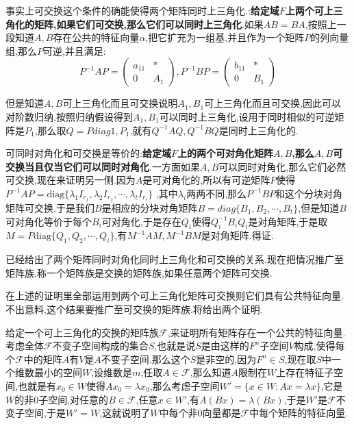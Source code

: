 事实上可交换这个条件的确能使得两个矩阵同时上三角化.:\textbf{给定域$F$上两个可上三角化的矩阵,如果它们可交换,那么它们可以同时上三角化}.如果$AB=BA$,按照上一段知道$A,B$存在公共的特征向量$\alpha$,把它扩充为一组基,并且作为一个矩阵$P$的列向量组,那么$P$可逆,并且满足:
$$P^{-1}AP=\left(\begin{array}{cc}
a_{11}&*\\
0&A_1
\end{array}\right),P^{-1}BP=\left(\begin{array}{cc}
b_{11}&*\\
0&B_1
\end{array}\right)$$

但是知道$A,B$可上三角化而且可交换说明$A_1,B_1$可上三角化而且可交换,因此可以对阶数归纳,按照归纳假设得到$A_1,B_1$可以同时上三角化,设用于同时相似的可逆矩阵是$P_1$,那么取$Q=P diag{1,P_1}$,就有$Q^{-1}AQ,Q^{-1}BQ$是同时上三角化的.

可同时对角化和可交换是等价的:\textbf{给定域$F$上的两个可对角化矩阵$A,B$,那么$A,B$可交换当且仅当它们可以同时对角化}.一方面如果$A,B$可以同时对角化,那么它们必然可交换,现在来证明另一侧.因为$A$是可对角化的,所以有可逆矩阵$P$使得$P^ {-1}AP=\mathrm{diag}\{\lambda_1I_{r_1},\lambda_2I_{r_2},\cdots,\lambda_tI_{r_t}\}$
,其中$\lambda_i$两两不同,那么$P^{-1}BP$和这个分块对角矩阵可交换.于是我们$B$是相应的分块对角矩阵$B=diag\{B_1,B_2,\cdots,B_t\}$,但是知道$B$可对角化等价于每个$B_i$可对角化,于是存在$Q_i$使得$Q_i^{-1}B_iQ_i$是对角矩阵,于是取$M=P\mathrm{diag}\{Q_1,Q_2,\cdots,Q_t\}$,有$M^ {-1}AM,M^{-1}BM$是对角矩阵.得证.

已经给出了两个矩阵同时对角化同时上三角化和可交换的关系.现在把情况推广至矩阵族.称一个矩阵族是交换的矩阵族,如果任意两个矩阵可交换.

在上述的证明里全部运用到两个可上三角化矩阵可交换则它们具有公共特征向量.不出意料,这个结果要推广至可交换的矩阵族.将给出两个证明.

给定一个可上三角化的交换的矩阵族$\mathscr{F}$,来证明所有矩阵存在一个公共的特征向量.考虑全体$\mathscr{F}$不变子空间构成的集合$S$,也就是说$S$是由这样的$F^n$子空间$V$构成,使得每个$\mathscr{F}$中的矩阵$A$有$V$是$A$不变子空间.那么这个$S$是非空的,因为$F^n\in S$,现在取$S$中一个维数最小的空间$W$,设维数是$m$,任取$A\in\mathscr{F}$,那么知道$A$限制在$W$上存在特征子空间,也就是有$x_0\in W$使得$Ax_0=\lambda x_0$,那么考虑子空间$W'=\{x\in W:Ax=\lambda x\}$,它是$W$的非0子空间,对任意的$B\in\mathscr{F}$,任意$x\in W'$,有$A(Bx)=\lambda(Bx)$,于是$W'$是$\mathscr{F}$不变子空间,于是$W'=W$,这就说明了$W$中每个非0向量都是$\mathscr{F}$中每个矩阵的特征向量.

